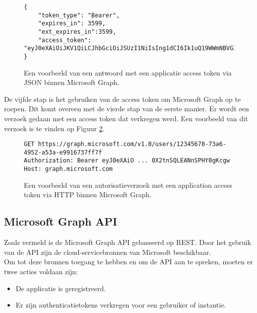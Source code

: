 \begin{figure}[!h]
    \footnotesize\begin{verbatim}
{
    "token_type": "Bearer",
    "expires_in": 3599,
    "ext_expires_in":3599,
    "access_token": "eyJ0eXAiOiJKV1QiLCJhbGciOiJSUzI1NiIsIng1dCI6Ik1uQ19WWmNBVGZNNXBP..."
} 
    \end{verbatim}    
    \caption[Voorbeeld Application Token Response Microsoft Graph]{Een voorbeeld van een antwoord met een applicatie access token via \ac{JSON} binnen Microsoft Graph.}
    \label{MSGATRRES}
\end{figure}

De vijfde stap is het gebruiken van de access token om Microsoft Graph op te roepen. Dit komt overeen met de vierde stap van de eerste manier. Er wordt een verzoek gedaan met een access token dat verkregen werd. Een voorbeeld van dit verzoek is te vinden op Figuur \ref{MSGAAT}.

\begin{figure}[!h]
    \footnotesize\begin{verbatim}
GET https://graph.microsoft.com/v1.0/users/12345678-73a6-4952-a53a-e9916737ff7f
Authorization: Bearer eyJ0eXAiO ... 0X2tnSQLEANnSPHY0gKcgw
Host: graph.microsoft.com
    \end{verbatim}    
    \caption[Voorbeeld Application autorisatieverzoek Microsoft Graph]{Een voorbeeld van een autorisatieverzoek met een application access token via \ac{HTTP} binnen Microsoft Graph.}
    \label{MSGAAT}
\end{figure}



\subsection{Microsoft Graph API}

Zoals vermeld is de Microsoft Graph \Ac{API} gebasseerd op \Ac{REST}. Door het gebruik van de \ac{API} zijn de cloud-servicebronnen van Microsoft beschikbaar. \\

Om tot deze bronnen toegang te hebben en om de \Ac{API} aan te spreken, moeten er twee acties voldaan zijn:

\begin{itemize}
    \item De applicatie is geregistreerd.
    \item Er zijn authenticatietokens verkregen voor een gebruiker of instantie.
\end{itemize}

